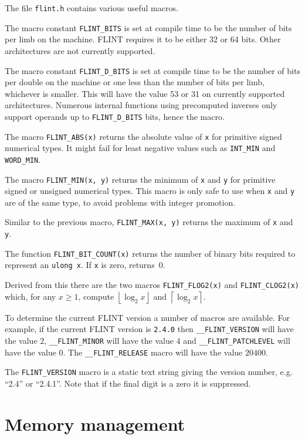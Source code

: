 \documentclass[a4paper,10pt]{book}
\providecommand{\floor}[1]{\left\lfloor#1\right\rfloor}%
\providecommand{\ceil}[1]{\left\lceil#1\right\rceil}%
\newcommand{\code}{\lstinline}
\begin{document}
The file \code{flint.h} contains various useful macros.

The macro constant \code{FLINT_BITS} is set at compile time to be the
number of bits per limb on the machine.  FLINT requires it to be either
32 or 64 bits.  Other architectures are not currently supported.

The macro constant \code{FLINT_D_BITS} is set at compile time to be the
number of bits per double on the machine or one less than the number of
bits per limb, whichever is smaller.  This will have the value 53 or 31
on currently supported architectures.  Numerous internal functions using
precomputed inverses only support operands up to \code{FLINT_D_BITS} bits,
hence the macro.

The macro \code{FLINT_ABS(x)} returns the absolute value of \code{x}
for primitive signed numerical types.  It might fail for least negative
values such as \code{INT_MIN} and \code{WORD_MIN}.

The macro \code{FLINT_MIN(x, y)} returns the minimum of \code{x} and
\code{y} for primitive signed or unsigned numerical types.  This macro
is only safe to use when \code{x} and \code{y} are of the same type,
to avoid problems with integer promotion.

Similar to the previous macro, \code{FLINT_MAX(x, y)} returns the
maximum of \code{x} and \code{y}.

The function \code{FLINT_BIT_COUNT(x)} returns the number of binary bits
required to represent an \code{ulong x}.  If \code{x} is zero,
returns~$0$.

Derived from this there are the two macros \code{FLINT_FLOG2(x)} and
\code{FLINT_CLOG2(x)} which, for any $x \geq 1$, compute $\floor{\log_2{x}}$
and $\ceil{\log_2{x}}$.

To determine the current FLINT version a number of macros are available.
For example, if the current FLINT version is \code{2.4.0} then
\code{__FLINT_VERSION} will have the value $2$, \code{__FLINT_MINOR}
will have the value $4$ and \code{__FLINT_PATCHLEVEL} will have the value
$0$. The \code{__FLINT_RELEASE} macro will have the value $20400$.

The \code{FLINT_VERSION} macro is a static text string giving the version
number, e.g. ``2.4'' or ``2.4.1''. Note that if the final digit is a zero
it is suppressed.

\chapter{Memory management}
\end{document}
